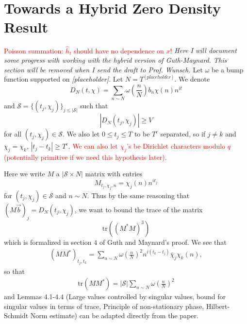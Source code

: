 \section{Towards a Hybrid Zero Density Result}
\textcolor{red}{Poisson summation: $\hat{h}_t$ should have no dependence on $x$!}
\textit{Here I will document some progress with working with
the hybrid version of Guth-Maynard. This section will be removed when I send the draft to Prof. Wunsch.}
Let $\omega$ be a bump function supported on \textit{[placeholder]}. Let $N=T^{[placeholder]}$. We denote \[
D_N(t,\chi) = \sum_{n\sim N} \omega\left(\frac{n}{N}\right)b_n \chi(n) n^{it}
\]
and $\mathcal{S}=\{(t_j,\chi_j)\}_{j\leq |\mathcal{S}|}$ such that 
\[
    |D_N(t_j,\chi_j)|\geq V
\]
for all $(t_j,\chi_j)\in\mathcal{S}$.
We also let $0\leq t_j\leq T$ to be $T^\epsilon$ separated, so if 
$j\neq k$ and $\chi_j=\chi_k$, $|t_j-t_k|\geq T^\epsilon$. \textcolor{red}{We can also
let $\chi_j$'s be Dirichlet characters modulo $q$ (potentially primitive if we need this hypothesis later).}

Here we write $M$ a $|\mathcal{S}\times N|$ matrix with entries
\[
    M_{t_j,\chi_j,n} = \chi_j(n)n^{it_j}
\]
for $(t_j,\chi_j)\in\mathcal{S}$ and $n\sim N$.
Thus by the same reasoning that $(M\vec{b})_j=D_N(t_j,\chi_j)$,
we want to bound the trace of the matrix \[
\textrm{tr}((M^*M)^3)
\]
which is formalized in section $4$ of Guth and Maynard's proof.
We see that \begin{align*}
    (MM^*)_{t_j,t_k} = \sum_{n\sim N} \omega\left(\frac{n}{N}\right)^2 n^{i(t_k-t_j)}\bar{\chi}_j\chi_k(n),
\end{align*}
so that \begin{align*}
    \textrm{tr}(MM^*) = |\mathcal{S}|\sum_{n\sim N} \omega\left(\frac{n}{N}\right)^2
\end{align*}
and Lemmas 4.1-4.4 (Large values controlled by singular values, bound for singular values in terms of trace,
Principle of non-stationary phase, Hilbert-Schmidt Norm estimate) can be adapted directly from the paper.

